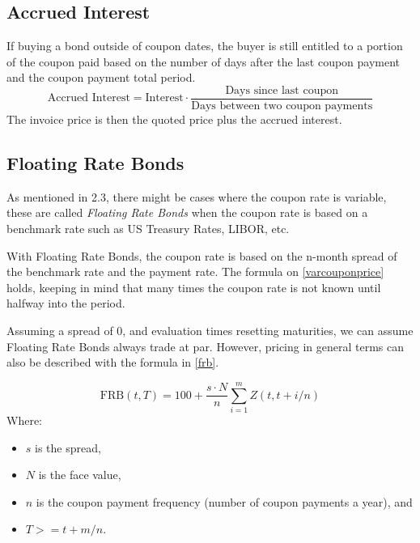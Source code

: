 \documentclass[10pt,letterpaper]{article}
\begin{document}
\subsection{Accrued Interest}
If buying a bond outside of coupon dates, the buyer is still entitled to a portion of the coupon paid based on the number of days after the last coupon payment and the coupon payment total period.
$$
\mbox{Accrued Interest} = \mbox{Interest} \cdot\frac{\mbox{Days since last coupon}}{\mbox{Days between two coupon payments}}
$$
The invoice price is then the quoted price plus the accrued interest.

\subsection{Floating Rate Bonds}
As mentioned in 2.3, there might be cases where the coupon rate is variable, these are called \emph{Floating Rate Bonds} when the coupon rate is based on a benchmark rate such as US Treasury Rates, LIBOR, etc.

With Floating Rate Bonds, the coupon rate is based on the n-month spread of the benchmark rate and the payment rate. The formula on \eqref{varcouponprice} holds, keeping in mind that many times the coupon rate is not known until halfway into the period.

Assuming a spread of 0, and evaluation times resetting maturities, we can assume Floating Rate Bonds always trade at par. However, pricing in general terms can also be described with the formula in \eqref{frb}.

\begin{equation}\label{frb}
\mbox{FRB}(t,T) = 100 + \frac{s \cdot N}{n}\sum_{i=1}^m Z(t, t + i/n)
\end{equation}
Where:
\begin{itemize}
\item $s$ is the spread,
\item $N$ is the face value,
\item $n$ is the coupon payment frequency (number of coupon payments a year), and
\item $T>= t+m/n$.
\end{itemize}
\end{document}
